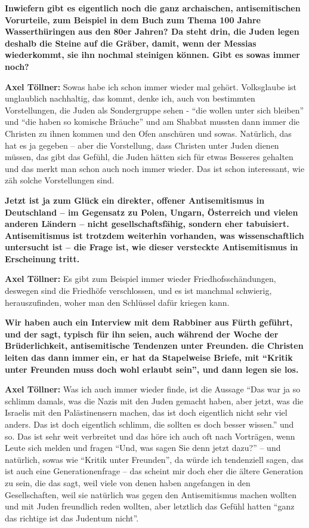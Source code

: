 \textbf{Inwiefern gibt es eigentlich noch die ganz archaischen, antisemitischen Vorurteile, zum Beispiel in dem Buch zum Thema 100 Jahre Wasserthüringen aus den 80er Jahren? Da steht drin, die Juden legen deshalb die Steine auf die Gräber, damit, wenn der Messias wiederkommt, sie ihn nochmal steinigen können. Gibt es sowas immer noch?} 

\textbf{Axel Töllner:} Sowas habe ich schon immer wieder mal gehört. Volksglaube ist unglaublich nachhaltig, das kommt, denke ich, auch von bestimmten Vorstellungen, die Juden als Sondergruppe sehen - "`die wollen unter sich bleiben"' und "`die haben so komische Bräuche"' und am Shabbat mussten dann immer die Christen zu ihnen kommen und den Ofen anschüren und sowas. Natürlich, das hat es ja gegeben – aber die Vorstellung, dass Christen unter Juden dienen müssen, das gibt das Gefühl, die Juden hätten sich für etwas Besseres gehalten und das merkt man schon auch noch immer wieder. Das ist schon interessant, wie zäh solche Vorstellungen sind. 

\textbf{Jetzt ist ja zum Glück ein direkter, offener Antisemitismus in Deutschland – im Gegensatz zu Polen, Ungarn, Österreich und vielen anderen Ländern – nicht gesellschaftsfähig, sondern eher tabuisiert. Antisemitismus ist trotzdem weiterhin vorhanden, was wissenschaftlich untersucht ist – die Frage ist, wie dieser versteckte Antisemitismus in Erscheinung tritt.} 

\textbf{Axel Töllner:} Es gibt zum Beispiel immer wieder Friedhofsschändungen, deswegen sind die Friedhöfe verschlossen, und es ist manchmal schwierig, herauszufinden, woher man den Schlüssel dafür kriegen kann.  

\textbf{Wir haben auch ein Interview mit dem Rabbiner aus Fürth geführt, und der sagt, typisch für ihn seien, auch während der Woche der Brüderlichkeit, antisemitische Tendenzen unter Freunden. die Christen leiten das dann immer ein, er hat da Stapelweise Briefe, mit "`Kritik unter Freunden muss doch wohl erlaubt sein"', und dann legen sie los.} 

\textbf{Axel Töllner:} Was ich auch immer wieder finde, ist die Aussage "`Das war ja so schlimm damals, was die Nazis mit den Juden gemacht haben, aber jetzt, was die Israelis mit den Palästinensern machen, das ist doch eigentlich nicht sehr viel anders. Das ist doch eigentlich schlimm, die sollten es doch besser wissen."' und so. Das ist sehr weit verbreitet und das höre ich auch oft nach Vorträgen, wenn Leute sich melden und fragen "`Und, was sagen Sie denn jetzt dazu?"' – und natürlich, sowas wie "`Kritik unter Freunden"', da würde ich tendenziell sagen, das ist auch eine Generationenfrage – das scheint mir doch eher die ältere Generation zu sein, die das sagt, weil viele von denen haben angefangen in den Gesellschaften, weil sie natürlich was gegen den Antisemitismus machen wollten und mit Juden freundlich reden wollten, aber letztlich das Gefühl hatten "`ganz das richtige ist das Judentum nicht"'. 


